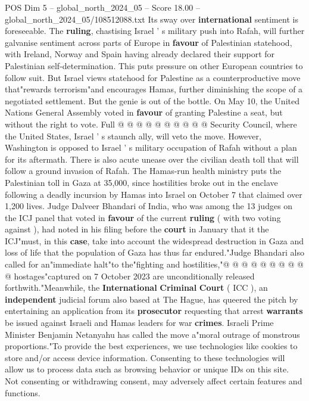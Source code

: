 \begin{textsample}{POS Dim 5 – global\_north\_2024\_05 – Score 18.00 – global\_north\_2024\_05/108512088.txt}
Its sway over \textbf{international} sentiment is foreseeable.
The \textbf{ruling}, chastising Israel ' s military push into Rafah, will further galvanise sentiment across parts of Europe in \textbf{favour} of Palestinian statehood, with Ireland, Norway and Spain having already declared their support for Palestinian self-determination.
This puts pressure on other European countries to follow suit.
But Israel views statehood for Palestine as a counterproductive move that"rewards terrorism"and encourages Hamas, further diminishing the scope of a negotiated settlement.
But the genie is out of the bottle.
On May 10, the United Nations General Assembly voted in \textbf{favour} of granting Palestine a seat, but without the right to vote.
Full @ @ @ @ @ @ @ @ @ @ Security Council, where the United States, Israel ' s staunch ally, will veto the move.
However, Washington is opposed to Israel ' s military occupation of Rafah without a plan for its aftermath.
There is also acute unease over the civilian death toll that will follow a ground invasion of Rafah.
The Hamas-run health ministry puts the Palestinian toll in Gaza at 35,000, since hostilities broke out in the enclave following a deadly incursion by Hamas into Israel on October 7 that claimed over 1,200 lives.
Judge Dalveer Bhandari of India, who was among the 13 judges on the ICJ panel that voted in \textbf{favour} of the current \textbf{ruling} ( with two voting against ), had noted in his filing before the \textbf{court} in January that it the ICJ"must, in this \textbf{case}, take into account the widespread destruction in Gaza and loss of life that the population of Gaza has thus far endured."Judge Bhandari also called for an"immediate halt"to the"fighting and hostilities,"@ @ @ @ @ @ @ @ @ @ hostages"captured on 7 October 2023 are unconditionally released forthwith."Meanwhile, the \textbf{International} \textbf{Criminal} \textbf{Court} ( ICC ), an \textbf{independent} judicial forum also based at The Hague, has queered the pitch by entertaining an application from its \textbf{prosecutor} requesting that arrest \textbf{warrants} be issued against Israeli and Hamas leaders for war \textbf{crimes}.
Israeli Prime Minister Benjamin Netanyahu has called the move a"moral outrage of monstrous proportions."To provide the best experiences, we use technologies like cookies to store and/or access device information.
Consenting to these technologies will allow us to process data such as browsing behavior or unique IDs on this site.
Not consenting or withdrawing consent, may adversely affect certain features and functions.

\end{textsample}
